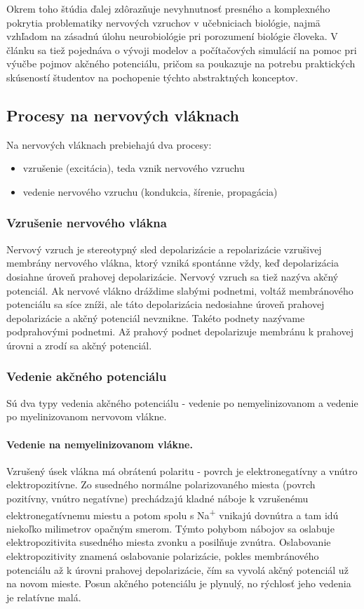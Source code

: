 Okrem toho štúdia ďalej zdôrazňuje nevyhnutnosť presného a komplexného pokrytia problematiky nervových vzruchov v učebniciach biológie, najmä vzhľadom na zásadnú úlohu neurobiológie 
pri porozumení biológie človeka. V článku sa tiež pojednáva o vývoji modelov a počítačových simulácií na pomoc pri výučbe pojmov akčného potenciálu, pričom sa poukazuje na potrebu 
praktických skúseností študentov na pochopenie týchto abstraktných konceptov. 



\subsection{Procesy na nervových vláknach}

Na nervových vláknach prebiehajú dva procesy: 
\begin{itemize}
  \item vzrušenie (excitácia), teda vznik nervového vzruchu
  \item vedenie nervového vzruchu (kondukcia, šírenie, propagácia)
\end{itemize}

\subsubsection{Vzrušenie nervového vlákna}

Nervový vzruch je stereotypný sled depolarizácie a repolarizácie vzrušivej membrány nervového vlákna, ktorý vzniká spontánne vždy, keď depolarizácia dosiahne úroveň prahovej depolarizácie.
Nervový vzruch sa tiež nazýva akčný potenciál. Ak nervové vlákno dráždime slabými podnetmi, voltáž membránového potenciálu sa síce zníži, ale táto depolarizácia nedosiahne úroveň prahovej
depolarizácie a akčný potenciál nevznikne. Takéto podnety nazývame podprahovými podnetmi. Až prahový podnet depolarizuje membránu k prahovej úrovni a zrodí sa akčný potenciál.

\subsubsection{Vedenie akčného potenciálu}

Sú dva typy vedenia akčného potenciálu - vedenie po nemyelinizovanom a vedenie po myelinizovanom nervovom vlákne.

\paragraph{Vedenie na nemyelinizovanom vlákne.}
Vzrušený úsek vlákna má obrátenú polaritu - povrch je elektronegatívny a vnútro elektropozitívne. Zo susedného normálne polarizovaného miesta (povrch pozitívny, vnútro negatívne) prechádzajú
kladné náboje k vzrušenému elektronegatívnemu miestu a potom spolu s Na\textsuperscript{+} vnikajú dovnútra a tam idú niekoľko milimetrov opačným smerom. Týmto pohybom nábojov sa oslabuje 
elektropozitivita susedného miesta zvonku a posilňuje zvnútra. Oslabovanie elektropozitivity znamená oslabovanie polarizácie, pokles membránového potenciálu až k úrovni prahovej depolarizácie,
čím sa vyvolá akčný potenciál už na novom mieste. Posun akčného potenciálu je plynulý, no rýchlosť jeho vedenia je relatívne malá.

